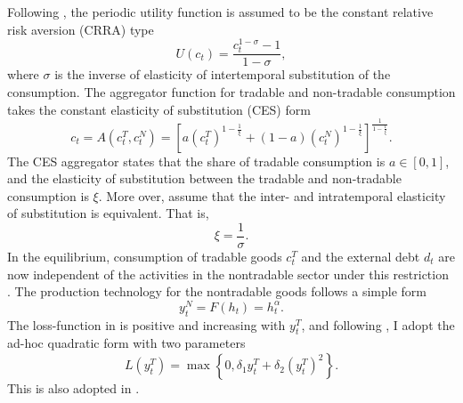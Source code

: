 Following \citet{Na-18}, the periodic utility function is assumed to be the constant relative risk aversion (CRRA) type
\begin{equation}
    \label{eq:CRRA-utility}
    U(c_t) = \frac{c_t^{1-\sigma} - 1}{1 - \sigma},
\end{equation}
where $\sigma$ is the inverse of elasticity of intertemporal substitution of the consumption.
The aggregator function for tradable and non-tradable consumption takes the constant elasticity of substitution (CES) form
\begin{equation}
    \label{eq:aggregator-function}
    c_t = A(c^T_t, c^N_t) =
        \left[ a \left( c^T_t \right)^{1- \frac{1}{\xi}} +
            (1 - a) \left( c^N_t \right)^{1- \frac{1}{\xi}}
        \right]^{\frac{1}{1 - \frac{1}{\xi}}}.
\end{equation}
The CES aggregator states that the share of tradable consumption is $a \in [0,1]$, and the elasticity of substitution between the tradable and non-tradable consumption is $\xi$. More over, assume that the inter- and intratemporal elasticity of substitution is equivalent. That is,
\begin{equation}
    \xi = \frac{1}{\sigma}.
\end{equation}
In the equilibrium, consumption of tradable goods $c^T_t$ and the external debt $d_t$ are now independent of the activities in the nontradable sector under this restriction \citep*[See][Chapter 9.5]{Uribe-Schmitt-Grohe-textbook}.
The production technology for the nontradable goods follows a simple form
\begin{equation}
    \label{eq:production-function}
    y^N_t = F(h_t) = h_t ^\alpha.
\end{equation}
The loss-function in  is positive and increasing with $y^T_t$, and following \citet{Chatterjee-12}, I adopt the ad-hoc quadratic form with two parameters
\begin{equation}
    L(y^T_t) = \max \left\{
        0, \delta_1 y^T_t + \delta_2 \left( y^T_t \right)^2
     \right\}.
\end{equation}
This is also adopted in \citet{Na-18}.